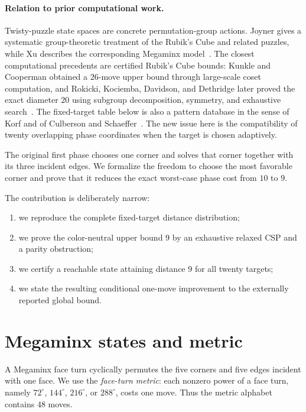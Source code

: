 \documentclass[11pt]{article}
\theoremstyle{definition}
\begin{document}
\paragraph{Relation to prior computational work.}
Twisty-puzzle state spaces are concrete permutation-group actions.  Joyner gives a systematic group-theoretic treatment of the Rubik's Cube and related puzzles, while Xu describes the corresponding Megaminx model~\cite{joyner2008,xu2018}.  The closest computational precedents are certified Rubik's Cube bounds: Kunkle and Cooperman obtained a $26$-move upper bound through large-scale coset computation, and Rokicki, Kociemba, Davidson, and Dethridge later proved the exact diameter $20$ using subgroup decomposition, symmetry, and exhaustive search~\cite{kunkle2007,rokicki2013}.  The fixed-target table below is also a pattern database in the sense of Korf and of Culberson and Schaeffer~\cite{korf1997,culberson1998}.  The new issue here is the compatibility of twenty overlapping phase coordinates when the target is chosen adaptively.

The original first phase chooses one corner and solves that corner together with its three incident edges.  We formalize the freedom to choose the most favorable corner and prove that it reduces the exact worst-case phase cost from $10$ to $9$.

The contribution is deliberately narrow:
\begin{enumerate}
  \item we reproduce the complete fixed-target distance distribution;
  \item we prove the color-neutral upper bound $9$ by an exhaustive relaxed CSP and a parity obstruction;
  \item we certify a reachable state attaining distance $9$ for all twenty targets;
  \item we state the resulting conditional one-move improvement to the externally reported global bound.
\end{enumerate}

\section{Megaminx states and metric}

A Megaminx face turn cyclically permutes the five corners and five edges incident with one face.  We use the \emph{face-turn metric}: each nonzero power of a face turn, namely $72^\circ$, $144^\circ$, $216^\circ$, or $288^\circ$, costs one move.  Thus the metric alphabet contains $48$ moves.
\end{document}
